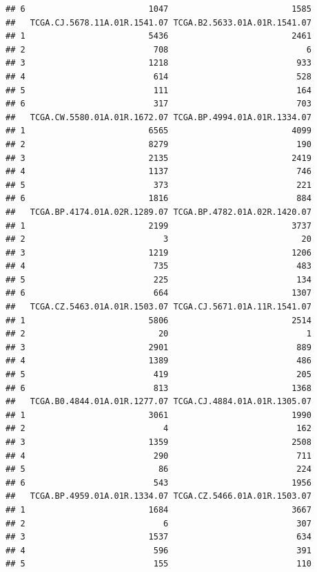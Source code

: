\documentclass[
]{article}
\begin{document}
\begin{verbatim}
## 6                         1047                         1585
##   TCGA.CJ.5678.11A.01R.1541.07 TCGA.B2.5633.01A.01R.1541.07
## 1                         5436                         2461
## 2                          708                            6
## 3                         1218                          933
## 4                          614                          528
## 5                          111                          164
## 6                          317                          703
##   TCGA.CW.5580.01A.01R.1672.07 TCGA.BP.4994.01A.01R.1334.07
## 1                         6565                         4099
## 2                         8279                          190
## 3                         2135                         2419
## 4                         1137                          746
## 5                          373                          221
## 6                         1816                          884
##   TCGA.BP.4174.01A.02R.1289.07 TCGA.BP.4782.01A.02R.1420.07
## 1                         2199                         3737
## 2                            3                           20
## 3                         1219                         1206
## 4                          735                          483
## 5                          225                          134
## 6                          664                         1307
##   TCGA.CZ.5463.01A.01R.1503.07 TCGA.CJ.5671.01A.11R.1541.07
## 1                         5806                         2514
## 2                           20                            1
## 3                         2901                          889
## 4                         1389                          486
## 5                          419                          205
## 6                          813                         1368
##   TCGA.B0.4844.01A.01R.1277.07 TCGA.CJ.4884.01A.01R.1305.07
## 1                         3061                         1990
## 2                            4                          162
## 3                         1359                         2508
## 4                          290                          711
## 5                           86                          224
## 6                          543                         1956
##   TCGA.BP.4959.01A.01R.1334.07 TCGA.CZ.5466.01A.01R.1503.07
## 1                         1684                         3667
## 2                            6                          307
## 3                         1537                          634
## 4                          596                          391
## 5                          155                          110

\end{verbatim}
\end{document}
